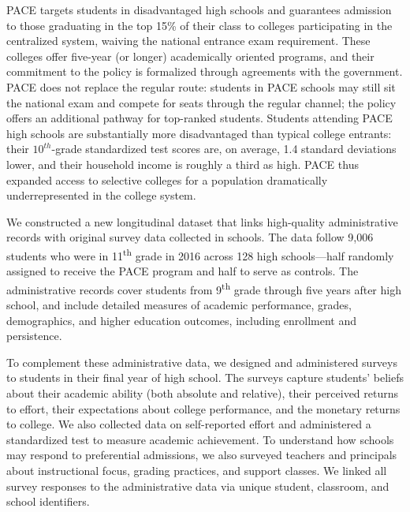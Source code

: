 PACE targets students in disadvantaged high schools and guarantees admission to those graduating in the top 15\% of their class to colleges participating in the centralized system, waiving the national entrance exam requirement. These colleges offer five-year (or longer) academically oriented programs, and their commitment to the policy is formalized through agreements with the government. PACE does not replace the regular route: students in PACE schools may still sit the national exam and compete for seats through the regular channel; the policy offers an additional pathway for top-ranked students. Students attending PACE high schools are substantially more disadvantaged than typical college entrants: their $10^{th}$-grade standardized test scores are, on average, 1.4 standard deviations lower, and their household income is roughly a third as high. PACE thus expanded access to selective colleges for a population dramatically underrepresented in the college system.\par 





We constructed a new longitudinal dataset that links high-quality administrative records with original survey data collected in schools. The data follow 9,006 students who were in 11\textsuperscript{th} grade in 2016 across 128 high schools—half randomly assigned to receive the PACE program and half to serve as controls. The administrative records cover students from 9\textsuperscript{th} grade through five years after high school, and include detailed measures of academic performance, grades, demographics, and higher education outcomes, including enrollment and persistence.\par 

To complement these administrative data, we designed and administered surveys to students in their final year of high school. The surveys capture students’ beliefs about their academic ability (both absolute and relative), their perceived returns to effort, their expectations about college performance, and the monetary returns to college. We also collected data on self-reported effort and administered a standardized test to measure academic achievement. To understand how schools may respond to preferential admissions, we also surveyed teachers and principals about instructional focus, grading practices, and support classes. We linked all survey responses to the administrative data via unique student, classroom, and school identifiers.\par 



